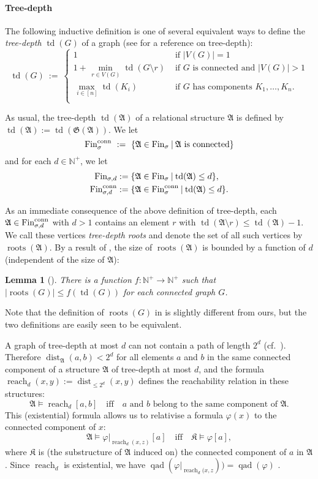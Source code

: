 \documentclass[11pt]{article}
\newtheorem{lemma}[theorem]{Lemma}
\renewcommand{\phi}{\varphi}
\newcommand{\fin}{\textup{Fin}}
\newcommand{\conn}{\text{conn}}
\newcommand{\qad}[1]{\operatorname{qad}(#1)}
\newcommand{\st}{\mathbin |}
\newcommand{\absval}[1]{\vert #1 \vert}
\newcommand{\rela}[2]{\ensuremath{{#1|}_{#2}}}
\DeclareMathOperator{\reach}{reach}
\newcommand{\struct}[1]{\mathfrak{#1}}
\newcommand{\AS}{\struct{A}}
\newcommand{\KS}{\struct{K}}
\newcommand{\GG}{\struct{G}}
\newcommand{\td}{\operatorname{td}}
\DeclareMathOperator{\tdroot}{roots}
\DeclareMathOperator{\dist}{dist}
\newcommand{\setc}[2]{\{#1 \st #2\}}
\newcommand{\Npos}{\mathbb{N}^{+}}
\begin{document}
\paragraph{Tree-depth}

The following inductive definition is one of several equivalent ways
to define the \emph{tree-depth} $\td(G)$ of a graph
(see \cite{NesetrilMendez2012} for a reference on tree-depth):
\[
\td(G)\ :=\ \begin{cases}
  1 & \text{ if } |V(G)| = 1\\
  1 + \min_{\,r\in V(G)} \td(G\setminus r) & \text{ if $G$ is connected and } |V(G)| > 1\\
  \max_{\,i\in [n]} \td(K_{i}) & \text{ if $G$ has components $K_{1}, \ldots, K_{n}$}.\\
\end{cases}
\]

As usual, the tree-depth $\td(\AS)$ of a relational structure $\AS$ is
defined by $\td(\AS) := \td(\GG(\AS))$. We let
\[
\fin^\conn_\sigma \ := \ \setc{\AS\in \fin_\sigma}{\AS \text{ is
    connected}}
\]
and for each $d\in \Npos$, we let
\[
\begin{split}
  \fin_{\sigma,d} &:= \setc{\AS \in \fin_\sigma}{\td(\AS) \leq d},
  \\
  \fin^\conn_{\sigma,d} &:= \setc{\AS \in \fin^\conn_\sigma}{\td(\AS) \leq d}.
\end{split}
\]

As an immediate consequence of the above definition of tree-depth, each $\AS\in
\fin^\conn_{\sigma,d}$ with $d > 1$ contains an element $r$ with $\td(\AS
\setminus r) \leq \td(\AS) - 1$. We call these vertices \emph{tree-depth roots}
and denote the set of all such vertices by $\tdroot(\AS)$. By a result of
\cite{BoulandDK12}, the size of $\tdroot(\AS)$ is bounded by a function of $d$
(independent of the size of $\AS$): 

\begin{lemma}[{\cite[Lem. 7]{BoulandDK12}}]
  \label{lem:roots}
  There is a function $f : \Npos \to \Npos$ such that
  $\absval{\tdroot(G)} \leq f(\td(G))$ for each connected graph $G$.
\end{lemma}

Note that the definition of $\tdroot(G)$ in \cite{BoulandDK12} is slightly
different from ours, but the two definitions are easily seen to be equivalent.

A graph of tree-depth at most $d$ can not contain a path of length
$2^d$ (cf.~\cite[6.2]{NesetrilMendez2012}). Therefore
$\dist_\AS(a,b) < 2^d$
for all elements $a$ and $b$ in the same connected component of a
structure $\AS$ of tree-depth at most $d$, and the formula
$\reach_{d}(x,y) := \dist_{\leq 2^{d}}(x,y)$
defines the reachability relation in these structures:
\[
\AS \models \reach_{d}[a,b]
\quad\text{iff}\quad
a\text{ and }b\text{ belong to the same component of }\AS.
\]
This (existential) formula allows us to relativise a formula
$\phi(x)$ to the connected component of $x$:
\[
\AS \models \rela{\phi}{\reach_d(x,z)}[a]
\quad\text{iff}\quad
\KS \models \phi[a],
\]
where $\KS$ is (the substructure of $\AS$ induced on) the connected component of
$a$ in $\AS$.  Since $\reach_d$ is existential, we have
$\qad{\rela{\phi}{\reach_d(x,z}}) = \qad{\phi}$ .
\end{document}
